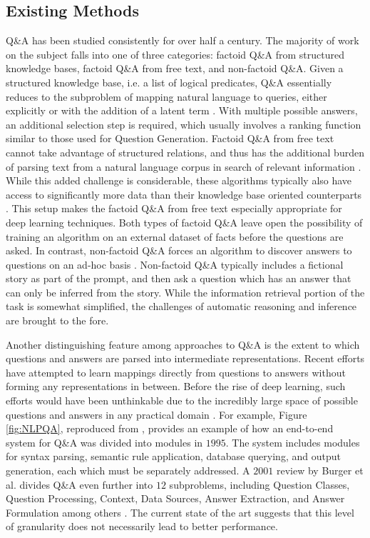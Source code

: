 \subsection{Existing Methods}

Q\&A has been studied consistently for over half a century. The majority of work on the subject falls into one of three categories: factoid Q\&A from structured knowledge bases, factoid Q\&A from free text, and non-factoid Q\&A. Given a structured knowledge base, i.e. a list of logical predicates, Q\&A essentially reduces to the subproblem of mapping natural language to queries, either explicitly or with the addition of a latent term \citep{yao2014information, zelle1996learning}. With multiple possible answers, an additional selection step is required, which usually involves a ranking function similar to those used for Question Generation. Factoid Q\&A from free text cannot take advantage of structured relations, and thus has the additional burden of parsing text from a natural language corpus in search of relevant information \citep{ravichandran2002learning}. While this added challenge is considerable, these algorithms typically also have access to significantly more data than their knowledge base oriented counterparts \citep{brill2001data, hermann2015teaching}. This setup makes the factoid Q\&A from free text especially appropriate for deep learning techniques. Both types of factoid Q\&A leave open the possibility of training an algorithm on an external dataset of facts before the questions are asked. In contrast, non-factoid Q\&A forces an algorithm to discover answers to questions on an ad-hoc basis \citep{soricut2004automatic}. Non-factoid Q\&A typically includes a fictional story as part of the prompt, and then ask a question which has an answer that can only be inferred from the story. While the information retrieval portion of the task is somewhat simplified, the challenges of automatic reasoning and inference are brought to the fore.

Another distinguishing feature among approaches to Q\&A is the extent to which questions and answers are parsed into intermediate representations. Recent efforts have attempted to learn mappings directly from questions to answers without forming any representations in between. Before the rise of deep learning, such efforts would have been unthinkable due to the incredibly large space of possible questions and answers in any practical domain \citep{hirschman2001natural}. For example, Figure \ref{fig:NLPQA}, reproduced from \citep{androutsopoulos1995natural}, provides an example of how an end-to-end system for Q\&A was divided into modules in $1995$. The system includes modules for syntax parsing, semantic rule application, database querying, and output generation, each which must be separately addressed. A $2001$ review by Burger et al. divides Q\&A even further into $12$ subproblems, including Question Classes, Question Processing, Context, Data Sources, Answer Extraction, and Answer Formulation among others \citep{burger2001issues}. The current state of the art suggests that this level of granularity does not necessarily lead to better performance.  

